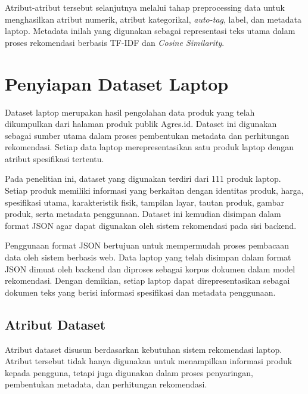 Atribut-atribut tersebut selanjutnya melalui tahap preprocessing data untuk menghasilkan atribut numerik, atribut kategorikal, \textit{auto-tag}, label, dan metadata laptop. Metadata inilah yang digunakan sebagai representasi teks utama dalam proses rekomendasi berbasis TF-IDF dan \textit{Cosine Similarity}.

\section{Penyiapan Dataset Laptop}
Dataset laptop merupakan hasil pengolahan data produk yang telah dikumpulkan dari halaman produk publik Agres.id. Dataset ini digunakan sebagai sumber utama dalam proses pembentukan metadata dan perhitungan rekomendasi. Setiap data laptop merepresentasikan satu produk laptop dengan atribut spesifikasi tertentu.

Pada penelitian ini, dataset yang digunakan terdiri dari 111 produk laptop. Setiap produk memiliki informasi yang berkaitan dengan identitas produk, harga, spesifikasi utama, karakteristik fisik, tampilan layar, tautan produk, gambar produk, serta metadata penggunaan. Dataset ini kemudian disimpan dalam format JSON agar dapat digunakan oleh sistem rekomendasi pada sisi backend.

Penggunaan format JSON bertujuan untuk mempermudah proses pembacaan data oleh sistem berbasis web. Data laptop yang telah disimpan dalam format JSON dimuat oleh backend dan diproses sebagai korpus dokumen dalam model rekomendasi. Dengan demikian, setiap laptop dapat direpresentasikan sebagai dokumen teks yang berisi informasi spesifikasi dan metadata penggunaan.

\subsection{Atribut Dataset}
Atribut dataset disusun berdasarkan kebutuhan sistem rekomendasi laptop. Atribut tersebut tidak hanya digunakan untuk menampilkan informasi produk kepada pengguna, tetapi juga digunakan dalam proses penyaringan, pembentukan metadata, dan perhitungan rekomendasi.

